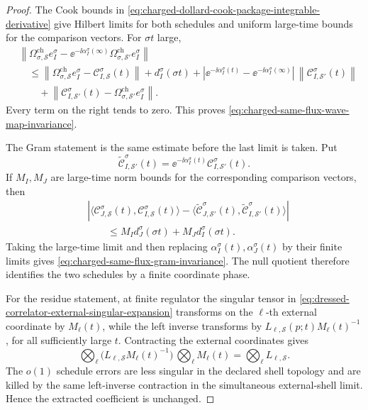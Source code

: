 \begin{proof}
The Cook bounds in
\eqref{eq:charged-dollard-cook-package-integrable-derivative} give Hilbert
limits for both schedules and uniform large-time bounds for the comparison
vectors.  For \(\sigma t\) large,
\[
\begin{aligned}
&
\left\|
  \Omega_{\sigma,\mathcal S}^{\mathrm{ch}}e_I^\sigma
  -
  \ee^{-\ii\alpha_I^\sigma(\infty)}
  \Omega_{\sigma,\mathcal S'}^{\mathrm{ch}}e_I^\sigma
\right\|
\\
&\quad\le
\left\|
  \Omega_{\sigma,\mathcal S}^{\mathrm{ch}}e_I^\sigma
  -
  \mathcal C_{I,\mathcal S}^{\sigma}(t)
\right\|
+
d_I^\sigma(\sigma t)
+
\left|
  \ee^{-\ii\alpha_I^\sigma(t)}
  -
  \ee^{-\ii\alpha_I^\sigma(\infty)}
\right|
\,
\left\|\mathcal C_{I,\mathcal S'}^{\sigma}(t)\right\|
\\
&\qquad+
\left\|
  \mathcal C_{I,\mathcal S'}^{\sigma}(t)
  -
  \Omega_{\sigma,\mathcal S'}^{\mathrm{ch}}e_I^\sigma
\right\| .
\end{aligned}
\]
Every term on the right tends to zero.  This proves
\eqref{eq:charged-same-flux-wave-map-invariance}.

The Gram statement is the same estimate before the last limit is taken.  Put
\[
  \widetilde{\mathcal C}_{I,\mathcal S'}^\sigma(t)
  =
  \ee^{-\ii\alpha_I^\sigma(t)}
  \mathcal C_{I,\mathcal S'}^\sigma(t).
\]
If \(M_I,M_J\) are large-time norm bounds for the corresponding comparison
vectors, then
\[
\begin{aligned}
&
\left|
  \langle
    \mathcal C_{J,\mathcal S}^{\sigma}(t),
    \mathcal C_{I,\mathcal S}^{\sigma}(t)
  \rangle
  -
  \langle
    \widetilde{\mathcal C}_{J,\mathcal S'}^\sigma(t),
    \widetilde{\mathcal C}_{I,\mathcal S'}^\sigma(t)
  \rangle
\right|
\\
&\qquad\le
M_I d_J^\sigma(\sigma t)+M_J d_I^\sigma(\sigma t).
\end{aligned}
\]
Taking the large-time limit and then replacing
\(\alpha_I^\sigma(t),\alpha_J^\sigma(t)\) by their finite limits gives
\eqref{eq:charged-same-flux-gram-invariance}.  The null quotient therefore
identifies the two schedules by a finite coordinate phase.

For the residue statement, at finite regulator the singular tensor in
\eqref{eq:dressed-correlator-external-singular-expansion} transforms on the
\(\ell\)-th external coordinate by \(M_\ell(t)\), while the left inverse
transforms by \(L_{\ell,\mathcal S}(p;t)M_\ell(t)^{-1}\), for all sufficiently
large \(t\).  Contracting the external coordinates gives
\[
  \bigotimes_{\ell}
  \bigl(L_{\ell,\mathcal S}M_\ell(t)^{-1}\bigr)
  \,
  \bigotimes_{\ell}M_\ell(t)
  =
  \bigotimes_{\ell}L_{\ell,\mathcal S}.
\]
The \(o(1)\) schedule errors are less singular in the declared shell topology
and are killed by the same left-inverse contraction in the simultaneous
external-shell limit.  Hence the extracted coefficient is unchanged.
\end{proof}

